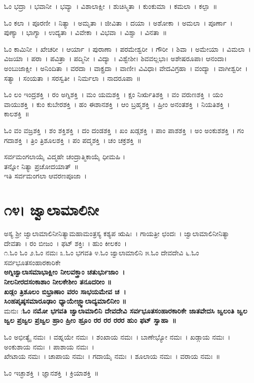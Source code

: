 ಓಂ ಭದ್ರಾ~। ಭವಾನೀ~। ಭವ್ಯಾ~। ವಿಶಾಲಾಕ್ಷೀ~। ಶುಚಿಸ್ಮಿತಾ~। ಕುಂಕುಮಾ~। ಕಮಲಾ~। ಕಲ್ಪಾ~॥ 

ಓಂ ಕಲಾ~। ಪೂರಣೀ~। ನಿತ್ಯಾ~। ಅಮೃತಾ~। ಜೀವಿತಾ~। ದಯಾ~। ಅಶೋಕಾ~। ಅಮಲಾ~। ಪೂರ್ಣಾ~। ಪುಣ್ಯಾ~। ಭಾಗ್ಯಾ~। ಉದ್ಯತಾ~। ವಿವೇಕಾ~। ವಿಭವಾ~। ವಿಶ್ವಾ~। ವಿನತಾ~॥ 

ಓಂ ಕಾಮಿನೀ~। ಖೇಚರೀ~। ಆರ್ಯಾ~। ಪುರಾಣಾ~। ಪರಮೇಶ್ವರೀ~। ಗೌರೀ~। ಶಿವಾ~। ಅಮೇಯಾ~। ವಿಮಲಾ~। ವಿಜಯಾ~। ಪರಾ~। ಪವಿತ್ರಾ~। ಪದ್ಮಿನೀ~। ವಿದ್ಯಾ~। ವಿಶ್ವೇಶೀ। ಶಿವವಲ್ಲಭಾ। ಅಶೇಷರೂಪಾ। ಆನಂದಾ। ಅಂಬುಜಾಕ್ಷೀ~। ಅನಿಂದಿತಾ~। ವರದಾ~। ವಾಕ್ಪ್ರದಾ~। ವಾಣೀ। ವಿವಿಧಾ। ವೇದವಿಗ್ರಹಾ~। ವಂದ್ಯಾ~। ವಾಗೀಶ್ವರೀ~। ಸತ್ಯಾ~। ಸಂಯತಾ~। ಸರಸ್ವತೀ~। ನಿರ್ಮಲಾ~। ನಾದರೂಪಾ~॥ 

ಓಂ ಲಂ ಇಂದ್ರಶಕ್ತಿ~। ರಂ ಅಗ್ನಿಶಕ್ತಿ~। ಮಂ ಯಮಶಕ್ತಿ~। ಕ್ಷಂ ನಿರ್ಋತಿಶಕ್ತಿ~। ವಂ ವರುಣಶಕ್ತಿ~। ಯಂ ವಾಯುಶಕ್ತಿ~। ಕುಂ ಕುಬೇರಶಕ್ತಿ~। ಹಂ ಈಶಾನಶಕ್ತಿ~। ಆಂ ಬ್ರಹ್ಮಶಕ್ತಿ~। ಹ್ರೀಂ ಅನಂತಶಕ್ತಿ~। ನಿಯತಿಶಕ್ತಿ~। ಕಾಲಶಕ್ತಿ~॥ 

ಓಂ ವಂ ವಜ್ರಶಕ್ತಿ~। ಶಂ ಶಕ್ತಿಶಕ್ತಿ~। ದಂ ದಂಡಶಕ್ತಿ~। ಖಂ ಖಡ್ಗಶಕ್ತಿ~। ಪಾಂ ಪಾಶಶಕ್ತಿ~। ಅಂ ಅಂಕುಶಶಕ್ತಿ~। ಗಂ ಗದಾಶಕ್ತಿ~। ತ್ರಿಂ ತ್ರಿಶೂಲಶಕ್ತಿ~। ಪಂ ಪದ್ಮಶಕ್ತಿ~। ಚಂ ಚಕ್ರಶಕ್ತಿ~॥

ಸರ್ವಮಂಗಲಾಯೈ ವಿದ್ಮಹೇ ಚಂದ್ರಾತ್ಮಿಕಾಯೈ ಧೀಮಹಿ ।\\ತನ್ನೋ ನಿತ್ಯಾ ಪ್ರಚೋದಯಾತ್~॥\\
ಇತಿ ಸರ್ವಮಂಗಲಾ ಆವರಣಪೂಜಾ~।
\section{೧೪। ಜ್ವಾಲಾಮಾಲಿನೀ}
ಅಸ್ಯ ಶ್ರೀ ಜ್ವಾಲಾಮಾಲಿನೀನಿತ್ಯಾಮಹಾಮಂತ್ರಸ್ಯ ಕಶ್ಯಪ ಋಷಿಃ~। ಗಾಯತ್ರೀ ಛಂದಃ~। ಜ್ವಾಲಾಮಾಲಿನೀನಿತ್ಯಾ ದೇವತಾ~। ರಂ ಬೀಜಂ~। ಫಟ್ ಶಕ್ತಿಃ~। ಹುಂ ಕೀಲಕಂ~।\\
೧.ಓಂ ಓಂ ೨.ಓಂ ನಮಃ ೩.ಓಂ ಭಗವತಿ ೪.ಓಂ ಜ್ವಾಲಾಮಾಲಿನಿ ೫.ಓಂ ದೇವದೇವಿ ೬.ಓಂ ಸರ್ವಭೂತಸಂಹಾರಕಾರಿಕೇ \\
{\bfseries ಅಗ್ನಿಜ್ವಾಲಾಸಮಾಭಾಕ್ಷೀಂ ನೀಲವಕ್ತ್ರಾಂ ಚತುರ್ಭುಜಾಂ~।\\ನೀಲನೀರದಸಂಕಾಶಾಂ ನೀಲಕೇಶೀಂ ತನೂದರೀಂ ॥\\
ಖಡ್ಗಂ ತ್ರಿಶೂಲಂ ಬಿಭ್ರಾಣಾಂ ವರಂ ಸಾಭಯಮೇವ ಚ~।\\ಸಿಂಹಪೃಷ್ಠಸಮಾರೂಢಾಂ ಧ್ಯಾಯೇಜ್ಜ್ವಾಲಾದ್ಯಮಾಲಿನೀಂ ॥\\}
ಮನುಃ :{\bfseries ಓಂ ನಮೋ ಭಗವತಿ ಜ್ವಾಲಾಮಾಲಿನಿ ದೇವದೇವಿ ಸರ್ವಭೂತಸಂಹಾರಕಾರಿಕೇ ಜಾತವೇದಸಿ ಜ್ವಲಂತಿ ಜ್ವಲ ಜ್ವಲ ಪ್ರಜ್ವಲ ಪ್ರಜ್ವಲ ಹ್ರಾಂ ಹ್ರೀಂ ಹ್ರೂಂ ರರ ರರ ರರರ ಹುಂ ಫಟ್ ಸ್ವಾಹಾ~॥}

ಓಂ ಅಭೀತ್ಯೈ ನಮಃ~। ವಹ್ನಯೇ ನಮಃ~। ಶಂಖಾಯ ನಮಃ~। ಬಾಣೇಭ್ಯೋ ನಮಃ~। ಖಡ್ಗಾಯ ನಮಃ~। ಅಂಕುಶಾಯ ನಮಃ~। ಪಾಶಾಯ ನಮಃ~। \\ಖೇಟಾಯ ನಮಃ~। ಚಾಪಾಯ ನಮಃ~। ಗದಾಯೈ ನಮಃ~। ಶೂಲಾಯ ನಮಃ~। ವರಾಯ ನಮಃ~॥

ಓಂ ಇಚ್ಛಾಶಕ್ತಿ~। ಜ್ಞಾನಶಕ್ತಿ~। ಕ್ರಿಯಾಶಕ್ತಿ~॥ 

